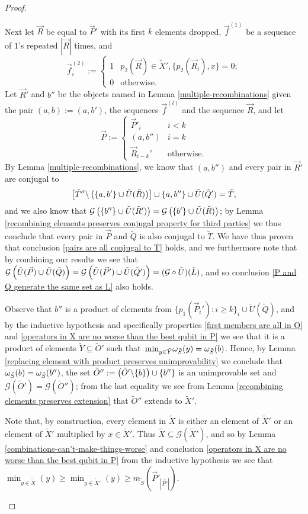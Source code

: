 \documentclass[twocolumn,showpacs,preprintnumbers,amsmath,amssymb,nofootinbib,pra,floatfix]{revtex4-1}
\newcommand{\lst}{\vec}
\newcommand{\set}{\tilde}
\newcommand{\genfun}{\mathcal{G}}
\begin{document}
\begin{proof}
\begin{description}
Next let $\lst R$ be equal to $\lst P'$ with its first $k$ elements dropped, $\lst f^{(1)}$ be a sequence of $1$'s repeated $|\lst R|$ times, and
$$\lst f^{(2)}_i :=
\begin{cases}
1 & p_2(\lst R)\in\set X', \{p_2(\lst R_i),x\} = 0; \\
0 & \text{otherwise}.
\end{cases}
$$
Let $\lst R'$ and $b''$ be the objects named in Lemma \ref{multiple-recombinations} given the pair $(a,b):=(a,b')$, the sequences $\lst f^{(l)}$ and the sequence $\lst R$, and let
$$\lst P :=
\begin{cases}
\lst P'_i & i < k \\
(a,b'') & i=k \\
\lst R_{i-k}' & \text{otherwise}.
\end{cases}
$$
By Lemma \ref{multiple-recombinations}, we know that $(a,b'')$ and every pair in $\lst R'$ are conjugal to
$$\left[\set T''\backslash\paren{\{a,b'\} \cup \set U(\set R)}\right]\cup \{a,b''\} \cup \set U(\set Q')=\set T,$$
and we also know that $\genfun\paren{\{b''\}\cup \set U(\set R')}=\genfun\paren{\{b'\}\cup \set U(\set R)}$;
by Lemma \ref{recombining elements preserves conjugal property for third parties} we thus conclude that every pair in $\lst P$ and $\set Q$ is also conjugal to $\set T$.  We have thus proven that conclusion \ref{pairs are all conjugal to T} holds, and we furthermore note that by combining our results we see that $\genfun\paren{\set U(\lst P)\cup \set U(\set Q)}=\genfun\paren{\set U(\lst P')\cup \set U(\set Q')}=(\genfun\circ\set U)(\set L)$, and so conclusion \ref{P and Q generate the same set as L} also holds.

Observe that $b''$ is a product of elements from $\{p_1(\lst P_i') : i \ge k\}_i\cup\set U(\set Q)$, and by the inductive hypothesis and specifically properties \ref{first members are all in O} and \ref{operators in X are no worse than the best qubit in P} we see that it is a product of elements $\set Y\subseteq\set O'$ such that $\min_{y\in\set Y}\om_{\set S}(y)=\om_{\set S}(b)$.  Hence, by Lemma \ref{replacing element with product preserves unimprovability} we conclude that $\om_{\set S}(b)=\om_{\set S}(b'')$, the set $\set O'':=\paren{\set O'\backslash\{b\}}\cup\{b''\}$ is an unimprovable set and $\genfun(\set O')=\genfun(\set O'')$;  from the last equality we see from Lemma \ref{recombining elements preserves extension} that $\set O''$ extends to $\set X'$.

Note that, by construction, every element in $\set X$ is either an element of $\set X'$ or an element of $\set X'$ multiplied by $x\in\set X'$.  Thus $\set X\subseteq \genfun(\set X')$, and so by Lemma \ref{combinations-can't-make-things-worse} and conclusion \ref{operators in X are no worse than the best qubit in P} from the inductive hypothesis we see that $\min_{y\in\set X}(y) \ge \min_{y\in\set X'}(y) \ge m_{\set S}(\lst P'_{|\lst P'|})$.


\end{description}
\end{proof}
\end{document}
